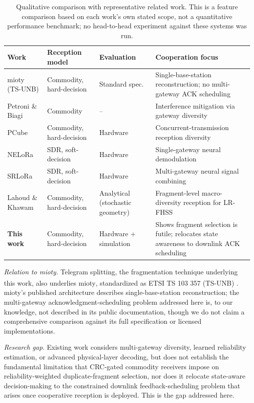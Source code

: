 \documentclass[journal]{IEEEtran}
\begin{document}
\begin{table}[t]
\caption{Qualitative comparison with representative related work. This is a feature comparison based on each work's own stated scope, not a quantitative performance benchmark; no head-to-head experiment against these systems was run.}
\label{tab:related-work-comparison}
\centering
\footnotesize
\begin{tabular}{@{}p{1.7cm}p{1.6cm}p{1.5cm}p{2.5cm}@{}}
\toprule
\textbf{Work} & \textbf{Reception model} & \textbf{Evaluation} & \textbf{Cooperation focus} \\
\midrule
mioty (TS-UNB) \cite{mioty2018} & Commodity, hard-decision & Standard spec. & Single-base-station reconstruction; no multi-gateway ACK scheduling \\
Petroni \& Biagi \cite{gw2022} & Commodity & -- & Interference mitigation via gateway diversity \\
PCube \cite{pcube2021} & Commodity, hard-decision & Hardware & Concurrent-transmission reception diversity \\
NELoRa \cite{nelora2021} & SDR, soft-decision & Hardware & Single-gateway neural demodulation \\
SRLoRa \cite{srlora2023} & SDR, soft-decision & Hardware & Multi-gateway neural signal combining \\
Lahoud \& Khawam \cite{ts2025} & Commodity, hard-decision & Analytical (stochastic geometry) & Fragment-level macro-diversity reception for LR-FHSS \\
\textbf{This work} & Commodity, hard-decision & Hardware + simulation & Shows fragment selection is futile; relocates state awareness to downlink ACK scheduling \\
\bottomrule
\end{tabular}
\end{table}

\textit{Relation to mioty.} Telegram splitting, the fragmentation technique underlying this work, also underlies mioty\textsuperscript{\textregistered}, standardized as ETSI TS 103 357 (TS-UNB) \cite{mioty2018}. mioty's published architecture describes single-base-station reconstruction; the multi-gateway acknowledgment-scheduling problem addressed here is, to our knowledge, not described in its public documentation, though we do not claim a comprehensive comparison against its full specification or licensed implementations.

\textit{Research gap.} Existing work considers multi-gateway diversity, learned reliability estimation, or advanced physical-layer decoding, but does not establish the fundamental limitation that CRC-gated commodity receivers impose on reliability-weighted duplicate-fragment selection, nor does it relocate state-aware decision-making to the constrained downlink feedback-scheduling problem that arises once cooperative reception is deployed. This is the gap addressed here.
\end{document}
